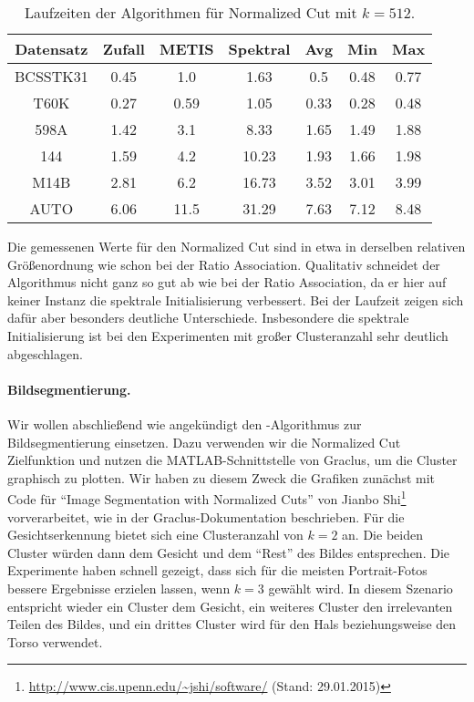 \begin{table}[h!]
\centering
\begin{tabular}{@{}ccccccc@{}} \toprule
	\textbf{Datensatz} & \textbf{Zufall} & \textbf{METIS} & \textbf{Spektral} & \textbf{Avg} & \textbf{Min} & \textbf{Max} \\ \midrule
	BCSSTK31 	& 0.45 & 1.0 & 1.63 & 0.5 & 0.48 & 0.77 \\
	T60K 		& 0.27 & 0.59 & 1.05 & 0.33 & 0.28 & 0.48 \\
	598A 		& 1.42 & 3.1 & 8.33 & 1.65 & 1.49 & 1.88 \\
	144 		& 1.59 & 4.2 & 10.23 & 1.93 & 1.66 & 1.98 \\
	M14B 		& 2.81 & 6.2 & 16.73 & 3.52 & 3.01 & 3.99 \\
	AUTO 		& 6.06 & 11.5 & 31.29 & 7.63 & 7.12 & 8.48 \\
	\bottomrule
\end{tabular}
\caption{Laufzeiten der Algorithmen für Normalized Cut mit $k = 512$.}
\label{tbl:experiment-experiment-kkmpp-ncut-runtime-512}
\end{table}

Die gemessenen Werte für den Normalized Cut sind in etwa in derselben relativen Größenordnung wie schon bei der 
Ratio Association. Qualitativ schneidet der Algorithmus \kkmpp{} nicht ganz so gut ab wie bei der Ratio Association, da
er hier auf keiner Instanz die spektrale Initialisierung verbessert. Bei der Laufzeit zeigen sich dafür aber besonders
deutliche Unterschiede. Insbesondere die spektrale Initialisierung ist bei den Experimenten mit großer Clusteranzahl
sehr deutlich abgeschlagen.
\paragraph{Bildsegmentierung.} Wir wollen abschließend wie angekündigt den \kkmpp-Algorithmus zur Bildsegmentierung einsetzen.
Dazu verwenden wir die Normalized Cut Zielfunktion und nutzen die MATLAB-Schnittstelle von Graclus, um die Cluster
graphisch zu plotten. Wir haben zu diesem Zweck die Grafiken zunächst mit Code für "`Image Segmentation with Normalized Cuts"' von
Jianbo Shi\footnote{\url{http://www.cis.upenn.edu/~jshi/software/} (Stand: 29.01.2015)} vorverarbeitet, wie in der
Graclus-Dokumentation beschrieben. Für die Gesichtserkennung bietet sich eine Clusteranzahl von $k = 2$ an. Die beiden
Cluster würden dann dem Gesicht und dem "`Rest"' des Bildes entsprechen. Die Experimente haben schnell gezeigt, dass sich für
die meisten Portrait-Fotos bessere Ergebnisse erzielen lassen, wenn $k = 3$ gewählt wird. In diesem Szenario entspricht wieder
ein Cluster dem Gesicht, ein weiteres Cluster den irrelevanten Teilen des Bildes, und ein drittes Cluster wird für
den Hals beziehungsweise den Torso verwendet.

